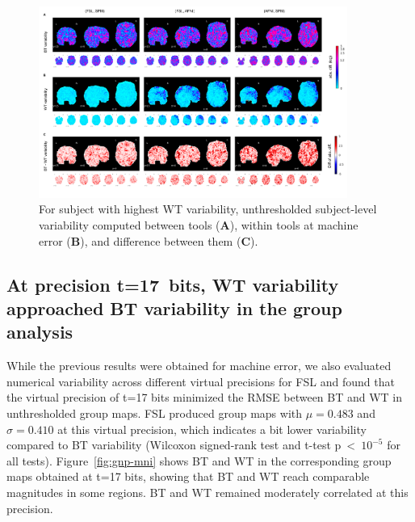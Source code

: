 \documentclass[11pt,onecolumn]{article}
\begin{document}
\begin{figure}[ht]
  \centering
  \includegraphics[width=0.9\textwidth]{figures/abs/sbj05-abs.png}
  \caption{For subject with highest WT variability,
    unthresholded subject-level variability computed between tools (\textbf{A}), within tools at machine error (\textbf{B}),
    and difference between them (\textbf{C}). }
  \label{fig:unthresh-maps-sbj}
\end{figure}

\subsection{At precision t=17~bits, WT variability approached BT variability in the group analysis}

While the previous results were obtained for machine error, we also
evaluated numerical variability across different virtual precisions for FSL
and found that the virtual precision of t=17 bits minimized the RMSE
between BT and WT in unthresholded group maps.
FSL produced group maps with $\mu=0.483$ and $\sigma=0.410$ at this virtual precision,
which indicates a bit lower variability compared to BT variability
(Wilcoxon signed-rank test and t-test p~\textless~$10^{-5}$ for all tests).
Figure~\ref{fig:gnp-mni} shows BT
and WT in the corresponding group maps obtained at t=17 bits, showing that
BT and WT reach comparable magnitudes in some regions. BT and WT remained
moderately correlated at this precision.
\end{document}
